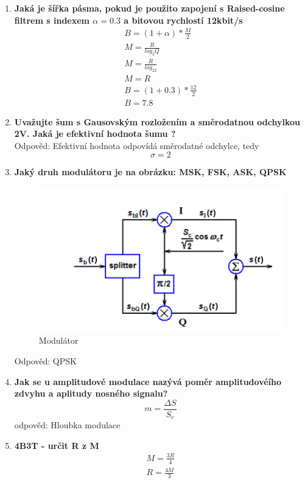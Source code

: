 \begin{enumerate}
    \item \textbf{Jaká je šířka pásma, pokud je použito zapojení s Raised-cosine filtrem s indexem $\alpha=0.3$ a bitovou rychlostí 12kbit/s}
    \begin{align*}
        B = (1+ \alpha)*\frac{M}{2} \\
        M= \frac{R}{log_2Q} \\
        M= \frac{R}{log_22} \\
        M=R \\
        B = (1+ 0.3)*\frac{12}{2} \\
        B= 7.8
    \end{align*}
    \item \textbf{Uvažujte šum s Gausovským rozložením a směrodatnou odchylkou 2V. Jaká je efektivní hodnota šumu ? }
    \\
    Odpověd: Efektivní hodnota odpovídá směrodatné odchylce, tedy
    $$\sigma=2$$
    \item  \textbf{Jaký druh modulátoru je na obrázku: MSK, FSK, ASK, QPSK}
    \begin{figure}[h!]
        \centering
        \includegraphics{images/QPSK.png}
        \caption{Modulátor}
        \label{fig:enter-label}
    \end{figure}

    Odpověd: QPSK

    \item \textbf{Jak se u amplitudové modulace nazývá poměr amplitudovéího zdvyhu a aplitudy
  nosného signalu?}
    $$
    m=\frac{\Delta S}{S_c}
    $$
    odpověd: Hloubka modulace


    \item \textbf{4B3T - určit R z M}
    \begin{align*}
    M=\frac{3R}{4}\\
    R=\frac{4M}{3}
    \end{align*}
   

\end{enumerate}
